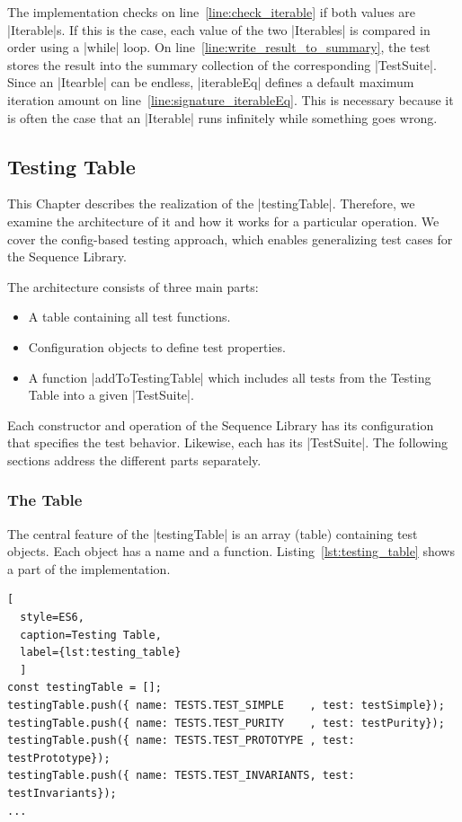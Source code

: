 The implementation checks on line~\ref{line:check_iterable} if both values are
|Iterable|s. If this is the case, each value of the two |Iterables| is compared
in order using a |while| loop. On line~\ref{line:write_result_to_summary}, the
test stores the result into the summary collection of the corresponding |TestSuite|.
\newline
Since an |Itearble| can be endless, |iterableEq| defines a default maximum
iteration amount on line~\ref{line:signature_iterableEq}.  This is necessary because it is often the case that an
|Iterable| runs infinitely while something goes wrong.


\subsection{Testing Table}
\label{sub:Testing Table}
This Chapter describes the realization of the |testingTable|. Therefore, we
examine the architecture of it and how it works for a particular operation. We
cover the config-based testing approach, which enables generalizing test cases
for the Sequence Library.

The architecture consists of three main parts:
\begin{itemize}
  \item{A table containing all test functions.}
  \item{Configuration objects to define test properties.}
  \item{A function |addToTestingTable| which includes all tests from the Testing
    Table into a given |TestSuite|.}
\end{itemize}

Each constructor and operation of the Sequence Library has its configuration
that specifies the test behavior. Likewise, each has its |TestSuite|. 
The following sections address the different parts separately.


\subsubsection{The Table}
\label{subsub:The Table}
The central feature of the |testingTable| is an array (table) containing test objects.
Each object has a name and a function. Listing~\ref{lst:testing_table} shows a 
part of the implementation.

\begin{lstlisting}[
  style=ES6, 
  caption=Testing Table,
  label={lst:testing_table}
  ]
const testingTable = [];
testingTable.push({ name: TESTS.TEST_SIMPLE    , test: testSimple});
testingTable.push({ name: TESTS.TEST_PURITY    , test: testPurity});
testingTable.push({ name: TESTS.TEST_PROTOTYPE , test: testPrototype});
testingTable.push({ name: TESTS.TEST_INVARIANTS, test: testInvariants});
...
\end{lstlisting}

